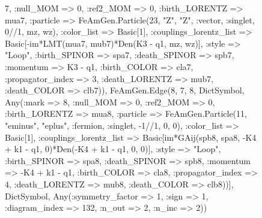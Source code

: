 \documentclass{revtex4}
\begin{document}
\begin{figure}[!htb]
\begin{center}
{7, :null_MOM => 0, :ref2_MOM => 0, :birth_LORENTZ => mua7, :particle => FeAmGen.Particle(23, "Z", "Z", :vector, :singlet, 0//1, mz, wz), :color_list => Basic[1], :couplings_lorentz_list => Basic[-im*LMT(mua7, mub7)*Den(K3 - q1, mz, wz)], :style => "Loop", :birth_SPINOR => spa7, :death_SPINOR => spb7, :momentum => K3 - q1, :birth_COLOR => cla7, :propagator_index => 3, :death_LORENTZ => mub7, :death_COLOR => clb7)), FeAmGen.Edge(8, 7, 8, Dict{Symbol, Any}(:mark => 8, :null_MOM => 0, :ref2_MOM => 0, :birth_LORENTZ => mua8, :particle => FeAmGen.Particle(11, "eminus", "eplus", :fermion, :singlet, -1//1, 0, 0), :color_list => Basic[1], :couplings_lorentz_list => Basic[im*GAij(spb8, spa8, -K4 + k1 - q1, 0)*Den(-K4 + k1 - q1, 0, 0)], :style => "Loop", :birth_SPINOR => spa8, :death_SPINOR => spb8, :momentum => -K4 + k1 - q1, :birth_COLOR => cla8, :propagator_index => 4, :death_LORENTZ => mub8, :death_COLOR => clb8))], Dict{Symbol, Any}(:symmetry_factor => 1, :sign => 1, :diagram_index => 132, :n_out => 2, :n_inc => 2)) 
}
\end{center}
\end{figure}
\end{document}
